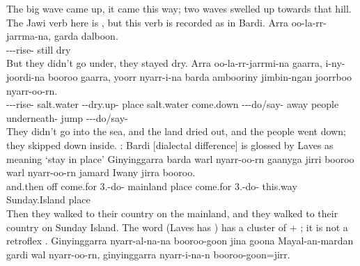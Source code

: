 \begin{exye}
\ft The big wave came up, it came this way; two waves swelled up towards that hill.
\nt The Jawi verb here is , but this verb is recorded as  in Bardi.
\exy {}
\gll Arra oo-la-rr-jarrma-na, garda dalboon.\\
 ---rise- still dry\\
\ft But they didn't go under, they stayed dry.
\exy {}
\gll Arra oo-la-rr-jarrmi-na gaarra, i-ny-joordi-na booroo gaarra, yoorr nyarr-i-na barda ambooriny jimbin-ngan joorrboo nyarr-oo-rn.\\
 ---rise- salt.water --dry.up- place salt.water come.down ---do/say- away people underneath- jump ---do/say-\\
\ft They didn't go into the sea, and the land dried out, and the people went down; they skipped down inside.
\llg {}: Bardi  [dialectal difference]
\nt {} is glossed by Laves as meaning  `stay in place'%
\newpage\exy {}
\gll Ginyinggarra barda warl nyarr-oo-rn gaanyga jirri booroo warl nyarr-oo-rn jamard Iwany jirra booroo.\\
and.then off come.for 3.-do- mainland  place come.for 3.-do- this.way Sunday.Island  place\\
\ft Then they walked to their country on the mainland, and they walked to their country on Sunday Island.
\nt The word  (Laves has ) has a cluster of  + ; it is not a retroflex .
\exy {}
\gll Ginyinggarra nyarr-al-na-na booroo-goon jina goona Mayal-an-mardan gardi wal nyarr-oo-rn, ginyinggarra nyarr-i-na-n booroo-goon=jirr.\\

\end{exye}
